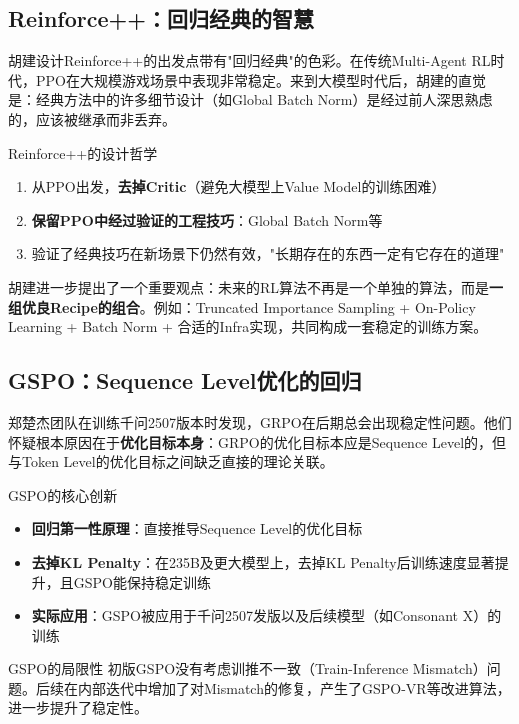 \subsection{Reinforce++：回归经典的智慧}

胡建设计Reinforce++的出发点带有"回归经典"的色彩。在传统Multi-Agent RL时代，PPO在大规模游戏场景中表现非常稳定。来到大模型时代后，胡建的直觉是：经典方法中的许多细节设计（如Global Batch Norm）是经过前人深思熟虑的，应该被继承而非丢弃。

\begin{importantbox}{Reinforce++的设计哲学}
\begin{enumerate}
    \item 从PPO出发，\textbf{去掉Critic}（避免大模型上Value Model的训练困难）
    \item \textbf{保留PPO中经过验证的工程技巧}：Global Batch Norm等
    \item 验证了经典技巧在新场景下仍然有效，"长期存在的东西一定有它存在的道理"
\end{enumerate}
\end{importantbox}

胡建进一步提出了一个重要观点：未来的RL算法不再是一个单独的算法，而是\textbf{一组优良Recipe的组合}。例如：Truncated Importance Sampling + On-Policy Learning + Batch Norm + 合适的Infra实现，共同构成一套稳定的训练方案。

\subsection{GSPO：Sequence Level优化的回归}

郑楚杰团队在训练千问2507版本时发现，GRPO在后期总会出现稳定性问题。他们怀疑根本原因在于\textbf{优化目标本身}：GRPO的优化目标本应是Sequence Level的，但与Token Level的优化目标之间缺乏直接的理论关联。

\begin{importantbox}{GSPO的核心创新}
\begin{itemize}
    \item \textbf{回归第一性原理}：直接推导Sequence Level的优化目标
    \item \textbf{去掉KL Penalty}：在235B及更大模型上，去掉KL Penalty后训练速度显著提升，且GSPO能保持稳定训练
    \item \textbf{实际应用}：GSPO被应用于千问2507发版以及后续模型（如Consonant X）的训练
\end{itemize}
\end{importantbox}

\begin{warningbox}{GSPO的局限性}
初版GSPO没有考虑训推不一致（Train-Inference Mismatch）问题。后续在内部迭代中增加了对Mismatch的修复，产生了GSPO-VR等改进算法，进一步提升了稳定性。
\end{warningbox}

